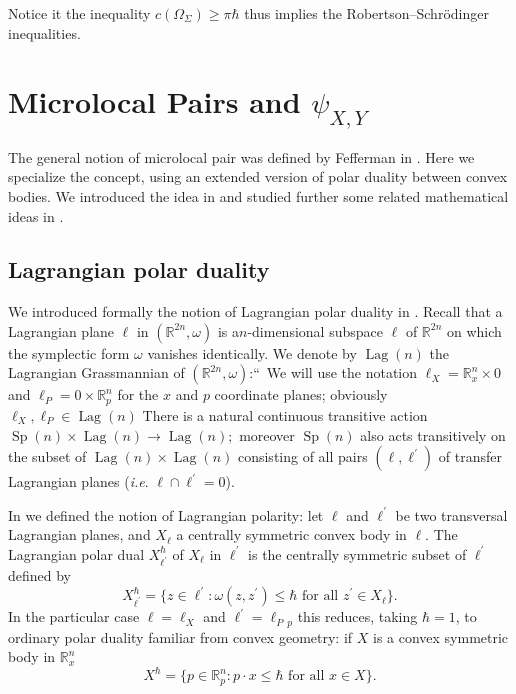 \documentclass[11pt]{article}%
\begin{document}
Notice it the inequality $c(\Omega_{\Sigma})\geq\pi\hbar$ thus implies the
Robertson--Schr\"{o}dinger inequalities.

\section{Microlocal Pairs and $\psi_{X,Y}$}

The general notion of microlocal pair was defined by Fefferman in
\cite{Fefferman}. Here we specialize the concept, using an extended version of
polar duality between convex bodies. We introduced the idea in
\cite{Poiuntilliswme} and studied further some related mathematical ideas in
\cite{BSM}.

\subsection{Lagrangian polar duality}

We introduced formally the notion of Lagrangian polar duality in \cite{BSM}.
Recall \cite{Birk,Birkbis} that a Lagrangian plane $\ell$ in $(\mathbb{R}%
^{2n},\omega)$ is a$n$-dimensional subspace $\ell$ of $\mathbb{R}^{2n}$ on
which the symplectic form $\omega$ vanishes identically. We denote by
$\operatorname*{Lag}(n)$ the Lagrangian Grassmannian of $(\mathbb{R}%
^{2n},\omega)$:\textquotedblleft\ We will use the notation $\ell
_{X}=\mathbb{R}_{x}^{n}\times0$ and $\ell_{P}=0\times\mathbb{R}_{p}^{n}$ for
the $x$ and $p$ coordinate planes; obviously $\ell_{X},\ell_{P}\in
\operatorname*{Lag}(n)$ There is a natural continuous transitive action
$\operatorname*{Sp}(n)\times\operatorname*{Lag}(n)\longrightarrow
\operatorname*{Lag}(n);$ moreover $\operatorname*{Sp}(n)$ also acts
transitively on the subset of $\operatorname*{Lag}(n)\times\operatorname*{Lag}%
(n)$ consisting of all pairs $(\ell,\ell^{\prime})$ of transfer Lagrangian
planes (\textit{i.e}. $\ell\cap\ell^{\prime}=0$).

In \cite{BSM} we defined the notion of Lagrangian polarity: let $\ell$ and
$\ell^{\prime}$ be two transversal Lagrangian planes, and $X_{\ell}$ a
centrally symmetric convex body in $\ell$. The Lagrangian polar dual
$X_{\ell^{\prime}}^{\hbar}$ of $X_{\ell}$ in $\ell^{\prime}$ is the centrally
symmetric subset of $\ell^{\prime}$ defined by
\begin{equation}
X_{\ell^{\prime}}^{\hbar}=\{z\in\ell^{\prime}:\omega(z,z^{\prime})\leq
\hbar\text{ \ for all \ }z^{\prime}\in X_{\ell}\}. \label{ozz}%
\end{equation}
In the particular case $\ell=\ell_{X}$ and $\ell^{\prime}=\ell_{P}{}_{p}$ this
reduces, taking $\hbar=1$, to ordinary polar duality familiar from convex
geometry: if $X$ is a convex symmetric body in $\mathbb{R}_{x}^{n}$
\begin{equation}
X^{\hbar}=\{p\in\mathbb{R}_{p}^{n}:p\cdot x\leq\hbar\text{ \ for all \ }x\in
X\}. \label{polar}%
\end{equation}
\end{document}
